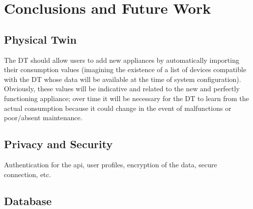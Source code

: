 \chapter{Conclusions and Future Work}\label{ch:conclusions}

\section{Physical Twin}

The DT should allow users to add new appliances by automatically importing their consumption values (imagining the existence of a list of devices compatible with the DT whose data will be available at the time of system configuration). Obviously, these values will be indicative and related to the new and perfectly functioning appliance; over time it will be necessary for the DT to learn from the actual consumption because it could change in the event of malfunctions or poor/absent maintenance.

\section{Privacy and Security}

Authentication for the api, user profiles, encryption of the data, secure connection, etc.

\section{Database}

